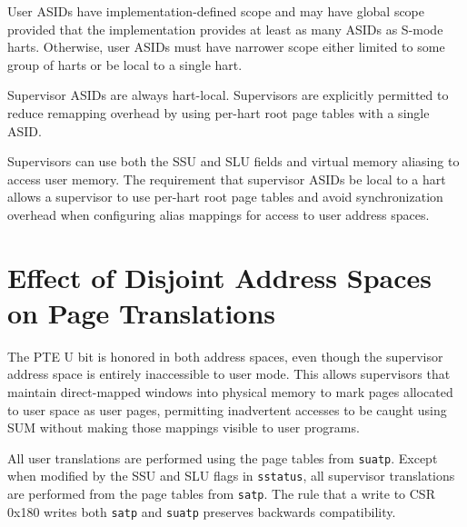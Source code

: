 User ASIDs have implementation-defined scope and may have global scope
provided that the implementation provides at least as many ASIDs as S-mode
harts.  Otherwise, user ASIDs must have narrower scope either limited to
some group of harts or be local to a single hart.

Supervisor ASIDs are always hart-local.  Supervisors are explicitly
permitted to reduce remapping overhead by using per-hart root page tables
with a single ASID.

\begin{commentary}
Supervisors can use both the SSU and SLU fields and virtual memory aliasing
to access user memory.  The requirement that supervisor ASIDs be local to a
hart allows a supervisor to use per-hart root page tables and avoid
synchronization overhead when configuring alias mappings for access to user
address spaces.
\end{commentary}

\section{Effect of Disjoint Address Spaces on Page Translations}

The PTE U bit is honored in both address spaces, even though the supervisor
address space is entirely inaccessible to user mode.  This allows
supervisors that maintain direct-mapped windows into physical memory to
mark pages allocated to user space as user pages, permitting inadvertent
accesses to be caught using SUM without making those mappings visible to
user programs.

All user translations are performed using the page tables from {\tt suatp}.
Except when modified by the SSU and SLU flags in {\tt sstatus}, all
supervisor translations are performed from the page tables from {\tt satp}.
The rule that a write to CSR 0x180 writes both {\tt satp} and {\tt suatp}
preserves backwards compatibility.
